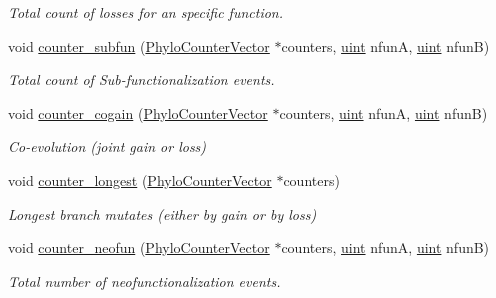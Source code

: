 \begin{Indent}
\begin{DoxyCompactItemize}
\begin{DoxyCompactList}\small\item\em Total count of losses for an specific function. \end{DoxyCompactList}\item 
void \hyperlink{namespacebarry_1_1counters_1_1phylo_a1e4ae98fb2aea199150308431518c4bf}{counter\+\_\+subfun} (\hyperlink{namespacebarry_1_1counters_1_1phylo_a2f117d1cd1dff67e1539cbc0aef5766a}{Phylo\+Counter\+Vector} $\ast$counters, \hyperlink{namespacebarry_a11dfc53ddb4672278319aa04f1e09a6c}{uint} nfunA, \hyperlink{namespacebarry_a11dfc53ddb4672278319aa04f1e09a6c}{uint} nfunB)
\begin{DoxyCompactList}\small\item\em Total count of Sub-\/functionalization events. \end{DoxyCompactList}\item 
void \hyperlink{namespacebarry_1_1counters_1_1phylo_ac5dde4b651c7600bd8533c2db9a66632}{counter\+\_\+cogain} (\hyperlink{namespacebarry_1_1counters_1_1phylo_a2f117d1cd1dff67e1539cbc0aef5766a}{Phylo\+Counter\+Vector} $\ast$counters, \hyperlink{namespacebarry_a11dfc53ddb4672278319aa04f1e09a6c}{uint} nfunA, \hyperlink{namespacebarry_a11dfc53ddb4672278319aa04f1e09a6c}{uint} nfunB)
\begin{DoxyCompactList}\small\item\em Co-\/evolution (joint gain or loss) \end{DoxyCompactList}\item 
void \hyperlink{namespacebarry_1_1counters_1_1phylo_a0961e61bafbce356cb78de10b0aa9950}{counter\+\_\+longest} (\hyperlink{namespacebarry_1_1counters_1_1phylo_a2f117d1cd1dff67e1539cbc0aef5766a}{Phylo\+Counter\+Vector} $\ast$counters)
\begin{DoxyCompactList}\small\item\em Longest branch mutates (either by gain or by loss) \end{DoxyCompactList}\item 
void \hyperlink{namespacebarry_1_1counters_1_1phylo_a9a68f426b83f9b7fad0457930b60064c}{counter\+\_\+neofun} (\hyperlink{namespacebarry_1_1counters_1_1phylo_a2f117d1cd1dff67e1539cbc0aef5766a}{Phylo\+Counter\+Vector} $\ast$counters, \hyperlink{namespacebarry_a11dfc53ddb4672278319aa04f1e09a6c}{uint} nfunA, \hyperlink{namespacebarry_a11dfc53ddb4672278319aa04f1e09a6c}{uint} nfunB)
\begin{DoxyCompactList}\small\item\em Total number of neofunctionalization events. \end{DoxyCompactList}\end{DoxyCompactItemize}
\end{Indent}


